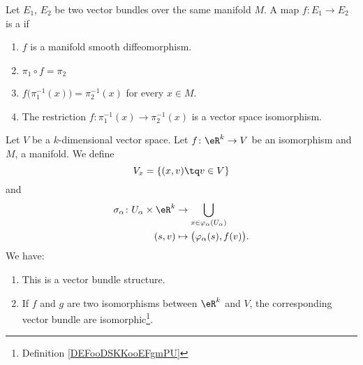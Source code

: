 \begin{definition}		\label{DEFooDSKKooEFgmPU}
	Let \( E_1\), \( E_2\) be two vector bundles over the same manifold \( M\). A map \(f \colon E_1\to E_2  \) is a  if
	\begin{enumerate}
		\item
		      \( f\) is a manifold smooth diffeomorphism.
		\item
		      \( \pi_1\circ f=\pi_2\)
		\item
		      \( f\big( \pi_1^{-1}(x) \big)=\pi_2^{-1}(x)\) for every \( x\in M\).
		\item
		      The restriction \(f \colon \pi_1^{-1}(x)\to \pi_2^{-1}(x)   \) is a vector space isomorphism.
	\end{enumerate}
\end{definition}


\begin{proposition}		\label{PROPooJZLEooYFgjnY}
	Let \( V\) be a \( k\)-dimensional vector space. Let \(f \colon \eR^k\to V  \) be an isomorphism and \( M\), a manifold. We define
	\begin{equation}
		V_x=\{ (x,v)\tq v\in V \}
	\end{equation}
	and
	\begin{equation}
		\begin{aligned}
			\sigma_{\alpha}\colon U_{\alpha}\times \eR^k & \to \bigcup_{x\in \varphi_{\alpha}(U_{\alpha})} \\
			(s,v)                                        & \mapsto \big( \varphi_{\alpha}(s),f(v) \big).
		\end{aligned}
	\end{equation}
	We have:
	\begin{enumerate}
		\item		\label{ITEMooYHUVooXUSryK}
		      This is a vector bundle structure.
		\item		\label{ITEMooCZLRooIJjQUn}
		      If \( f\) and \( g\) are two isomorphisms between \( \eR^k\) and \( V\), the corresponding vector bundle are isomorphic\footnote{Definition \ref{DEFooDSKKooEFgmPU}}.
	\end{enumerate}
\end{proposition}

